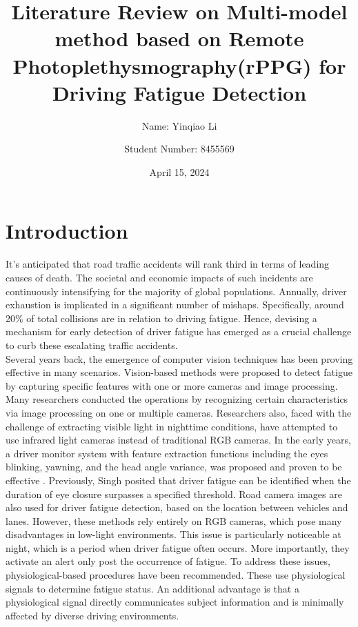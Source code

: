 \documentclass[a4paper]{article}
\begin{document}
\title{Literature Review on Multi-model method based on Remote Photoplethysmography(rPPG) for Driving Fatigue Detection}

\author{Name: Yinqiao Li \and Student Number: 8455569}

\date{April 15, 2024}

\maketitle


\section{Introduction}
It's anticipated that road traffic accidents will rank third in terms of leading causes of death. 
The societal and economic impacts of such incidents are continuously intensifying for the majority of global populations. 
Annually, driver exhaustion is implicated in a significant number of mishaps. 
Specifically, around 20\% of total collisions are in relation to driving fatigue. 
Hence, devising a mechanism for early detection of driver fatigue has emerged as a crucial challenge to curb these escalating traffic accidents.
\\Several years back, the emergence of computer vision techniques has been proving effective in many scenarios. 
Vision-based methods were proposed to detect fatigue by capturing specific features with one or more cameras and image processing. 
Many researchers conducted the operations by recognizing certain characteristics via image processing on one or multiple cameras. 
Researchers also, faced with the challenge of extracting visible light in nighttime conditions, have attempted to use infrared light cameras instead of traditional RGB cameras. 
In the early years, a driver monitor system with feature extraction functions including the eyes blinking, yawning, and the head angle variance, was proposed and proven to be effective \cite{luo2013driver,mbouna2013visual}. 
Previously, Singh posited that driver fatigue can be identified when the duration of eye closure surpasses a specified threshold\cite{singh1999monitoring}. 
Road camera images are also used for driver fatigue detection, based on the location between vehicles and lanes\cite{tsai2020vision}.  
However, these methods rely entirely on RGB cameras, which pose many disadvantages in low-light environments. This issue is particularly noticeable at night, which is a period when driver fatigue often occurs. More importantly, they activate an alert only post the occurrence of fatigue. 
To address these issues, physiological-based procedures have been recommended. 
These use physiological signals to determine fatigue status. 
An additional advantage is that a physiological signal directly communicates subject information and is minimally affected by diverse driving environments.
\end{document}
